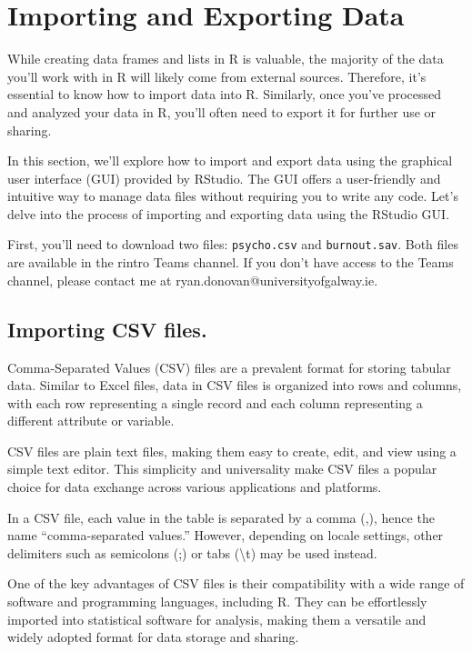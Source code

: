 \documentclass[
]{book}
\begin{document}
\hypertarget{importing}{%
\section{Importing and Exporting Data}\label{importing}}

While creating data frames and lists in R is valuable, the majority of the data you'll work with in R will likely come from external sources. Therefore, it's essential to know how to import data into R. Similarly, once you've processed and analyzed your data in R, you'll often need to export it for further use or sharing.

In this section, we'll explore how to import and export data using the graphical user interface (GUI) provided by RStudio. The GUI offers a user-friendly and intuitive way to manage data files without requiring you to write any code. Let's delve into the process of importing and exporting data using the RStudio GUI.

First, you'll need to download two files: \texttt{psycho.csv} and \texttt{burnout.sav}. Both files are available in the rintro Teams channel. If you don't have access to the Teams channel, please contact me at ryan.donovan@universityofgalway.ie.

\hypertarget{importing-csv-files.}{%
\subsection{Importing CSV files.}\label{importing-csv-files.}}

Comma-Separated Values (CSV) files are a prevalent format for storing tabular data. Similar to Excel files, data in CSV files is organized into rows and columns, with each row representing a single record and each column representing a different attribute or variable.

CSV files are plain text files, making them easy to create, edit, and view using a simple text editor. This simplicity and universality make CSV files a popular choice for data exchange across various applications and platforms.

In a CSV file, each value in the table is separated by a comma (,), hence the name ``comma-separated values.'' However, depending on locale settings, other delimiters such as semicolons (;) or tabs (\textbackslash t) may be used instead.

One of the key advantages of CSV files is their compatibility with a wide range of software and programming languages, including R. They can be effortlessly imported into statistical software for analysis, making them a versatile and widely adopted format for data storage and sharing.
\end{document}

